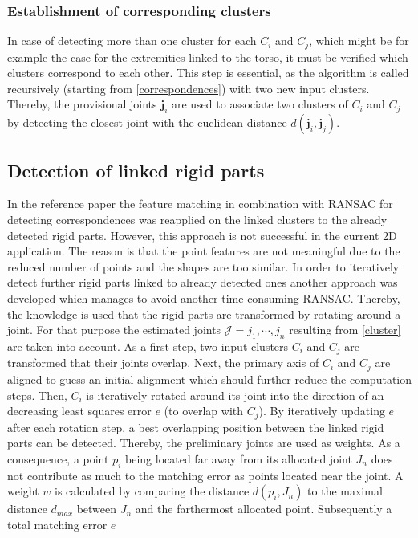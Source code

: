 \subsubsection{Establishment of corresponding clusters}
\label{CorrespondingClusters}
In case of detecting more than one cluster for each $C_i$ and $C_j$, which might be for example the case for the extremities linked to the torso, it must be verified which clusters correspond to each other. This step is essential, as the algorithm is called recursively (starting from \ref{correspondences}) with two new input clusters. Thereby, the provisional joints $\boldsymbol{j}_i$ are used to associate two clusters of $C_i$ and $C_j$ by detecting the closest joint with the euclidean distance $d(\boldsymbol{j}_i,\boldsymbol{j}_j)$.

\subsection{Detection of linked rigid parts}
\label{JointWeights}
In the reference paper the feature matching in combination with RANSAC for detecting correspondences was reapplied on the linked clusters to the already detected rigid parts. However, this approach is not successful in the current 2D application. The reason is that the point features are not meaningful due to the reduced number of points and the shapes are too similar. In order to iteratively detect further rigid parts linked to already detected ones another approach was developed which manages to avoid another time-consuming RANSAC. Thereby, the knowledge is used that the rigid parts are transformed by rotating around a joint. For that purpose the estimated joints $\mathcal{J} = j_1,\cdots,j_n$ resulting from \ref{cluster} are taken into account. As a first step, two input clusters $C_i$ and $C_j$ are transformed that their joints overlap. Next, the primary axis of $C_i$ and $C_j$ are aligned to guess an initial alignment which should further reduce the computation steps. Then, $C_i$ is iteratively rotated around its joint into the direction of an decreasing least squares error $e$ (to overlap with $C_j$). By iteratively updating $e$ after each rotation step, a best overlapping position between the linked rigid parts can be detected. Thereby, the preliminary joints are used as weights. As a consequence, a point $p_i$ being located far away from its allocated joint $J_n$ does not contribute as much to the matching error as points located near the joint. A weight $w$ is calculated by comparing the distance $d(p_i, J_n)$ to the maximal distance $d_{max}$ between $J_n$ and the farthermost allocated point. Subsequently a total matching error $e$
